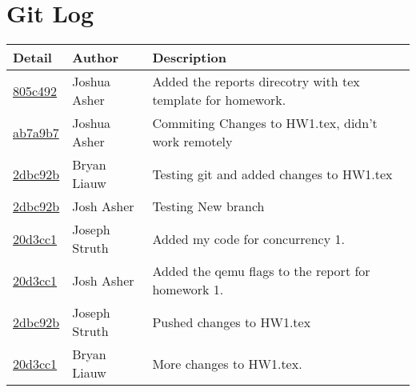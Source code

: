 \documentclass[10pt,draftclsnofoot,onecolumn, compsoc]{IEEEtran}
\begin{document}
\section{Git Log}
\begin{tabular}{| l | l | p{15cm} |}\textbf{Detail} & \textbf{Author} & \textbf{Description}\\\hline
\href{ssh://asherj@os-class.engr.oregonstate.edu/scratch/spring2017/13-03/commit/805c492e98007c3a790adbf9a93510e3d1554b9e}{805c492}&Joshua Asher&Added the reports direcotry with tex template for homework.\\\hline
\href{ssh://asherj@os-class.engr.oregonstate.edu/scratch/spring2017/13-03/commit/ab7a9b7f1f030f5833b1f23f416d8fab0e95cb72}{ab7a9b7}&Joshua Asher&Commiting Changes to HW1.tex, didn't work remotely\\\hline
\href{ssh://liauwb@os-class.engr.oregonstate.edu/scratch/spring2017/13-03/commit/be8839aa4b12089b34597dbc92bb1d5bdab577f}{2dbc92b}&Bryan Liauw&Testing git and added changes to HW1.tex\\\hline
\href{ssh://asherj@os-class.engr.oregonstate.edu/scratch/spring2017/13-03/commit/2dbc92bb1d5bd13fe53785d348475ffe2e21c7e8}{2dbc92b}&Josh Asher&Testing New branch\\\hline
\href{ssh://struthj@os-class.engr.oregonstate.edu/scratch/spring2017/13-03/commit/b67dfc110164531a41258d3b958b7baf59fda87}{20d3cc1}&Joseph Struth&Added my code for concurrency 1.\\\hline
\href{ssh://asherj@os-class.engr.oregonstate.edu/scratch/spring2017/13-03/commit/20d3cc110164531a41258d3b958b7baf59d0b38a}{20d3cc1}&Josh Asher&Added the qemu flags to the report for homework 1.\\
\href{ssh://struthj@os-class.engr.oregonstate.edu/scratch/spring2017/13-03/commit/7dbc92bb1d5bdab577fbe8839aa4b12089b3459}{2dbc92b}&Joseph Struth&Pushed changes to HW1.tex\\\hline
\href{ssh://liauwb@os-class.engr.oregonstate.edu/scratch/spring2017/13-03/commit/41258d3b958b7baf59b67dfc110164531afda87}{20d3cc1}&Bryan Liauw&More changes to HW1.tex.\\\hline
\end{tabular}
\end{document}
